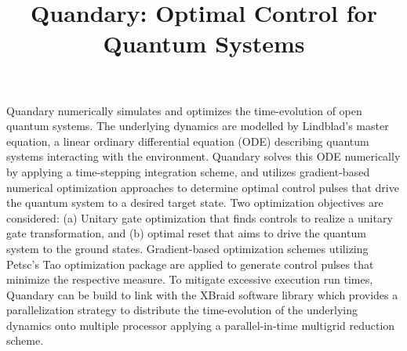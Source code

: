 \documentclass[letterpaper]{article}
\title{Quandary: Optimal Control for Quantum Systems}
\begin{document}
\maketitle


Quandary numerically simulates and optimizes the time-evolution of open quantum systems. The underlying dynamics are modelled by Lindblad's master equation, a linear ordinary differential equation (ODE) describing quantum systems interacting with the environment. Quandary solves this ODE numerically by applying a time-stepping integration scheme, and utilizes gradient-based numerical optimization approaches to determine optimal control pulses that drive the quantum system to a desired target state. 
Two optimization objectives are considered: (a) Unitary gate optimization that finds controls to realize a unitary gate transformation, and (b) optimal reset that aims to drive the quantum system to the ground states. 
Gradient-based optimization schemes utilizing Petsc's Tao optimization package are applied to generate control pulses that minimize the respective measure. 
To mitigate excessive execution run times, Quandary can be build to link with the XBraid software library which provides a parallelization strategy to distribute the time-evolution of the underlying dynamics onto multiple processor applying a parallel-in-time multigrid reduction scheme. 
\end{document}
